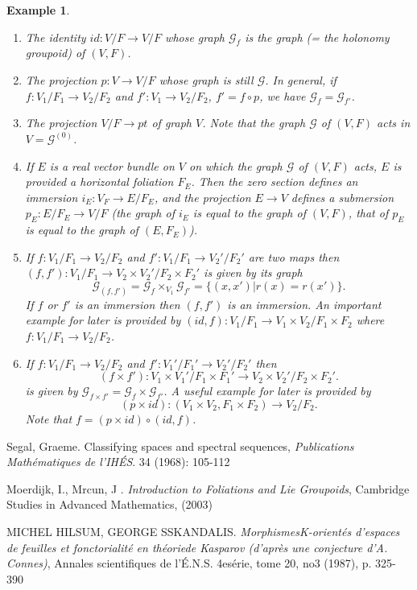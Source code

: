\documentclass[12pt]{amsart}
\newtheorem{example}[thm]{Example}
\theoremstyle{definition}
\theoremstyle{remark}
\numberwithin{equation}{section}
\newcommand{\CG}{{\mathcal G}}
\begin{document}
\begin{example}
\begin{enumerate}
    \item The identity $id: V/F \to V/F$ whose graph $\CG_f$ is the graph (= the holonomy groupoid) of $(V, F)$.
    \item The projection $p: V\to V/F$ whose graph is still $\CG$. In general, if $f: V_1/F_1 \to V_2/F_2$ and $f': V_1 \to V_2/F_2$, $f' = f \circ p$, we have $\CG_f = \CG_{f'}$.
    \item The projection $V/F \to pt$ of graph $V$. Note that the graph $\CG$ of $(V, F)$ acts in $V = \CG^{(0)}$.
    \item If $E$ is a real vector bundle on $V$ on which the graph $\CG$ of $(V,F)$ acts, $E$ is provided a horizontal foliation $F_E$. Then the zero section defines an immersion $i_E: V_F \to E/F_E$, and the projection $E \to V$ defines a submersion $p_E: E/F_E \to V/F$ (the graph of $i_E$ is equal to the graph of $(V, F)$, that of $p_E$ is equal to the graph of $(E, F_E)$).
    \item If $f:V_1/F_1 \to V_2/F_2$ and $f':V_1/F_1 \to V_2'/F_2'$ are two maps then $(f, f'): V_1/F_1 \to V_2 \times V_2'/F_2 \times F_2'$ is given by its graph
    $$
    \CG_{(f,f')} = \CG_{f} \times_{V_1} \CG_{f'} =\{(x,x')| r(x) = r(x')\}.  
    $$
    If $f$ or $f'$ is an immersion then $(f, f')$ is an immersion. An important example for later is provided by $(id, f): V_1/F_1 \to V_1 \times V_2/ F_1 \times F_2 $ where $f:V_1/F_1 \to V_2/F_2$.
    
    \item If $f:V_1/F_1 \to V_2/F_2$ and $f':V_1'/F_1' \to V_2'/F_2'$ then 
    $$(f\times f'): V_1\times V_1'/F_1\times F_1' \to V_2 \times V_2'/F_2 \times F_2'.$$ is given by
    $\CG_{f \times f'} = \CG_f \times \CG_{f'}$. A useful example for later is provided by
    $$
    (p \times id): (V_1 \times V_2, F_1 \times F_2) \to V_2 / F_2.
    $$
    Note that $f = (p\times id) \circ (id, f)$.
\end{enumerate}
\end{example}



\begin{thebibliography}{10}

	 Segal, Graeme. Classifying spaces and spectral sequences, \textit{Publications Mathématiques de l'IHÉS}. 34 (1968): 105-112
	
	 Moerdijk, I.,  Mrcun, J .  \textit{Introduction to Foliations and Lie Groupoids},
Cambridge Studies in Advanced Mathematics, (2003)

MICHEL HILSUM, GEORGE SSKANDALIS. \textit{MorphismesK-orientés d’espaces de feuilles et fonctorialité en théoriede Kasparov (d’après une conjecture d’A. Connes)}, Annales scientifiques de l’É.N.S. 4esérie, tome  20, no3 (1987), p. 325-390
	
	
\end{thebibliography}
\end{document}
